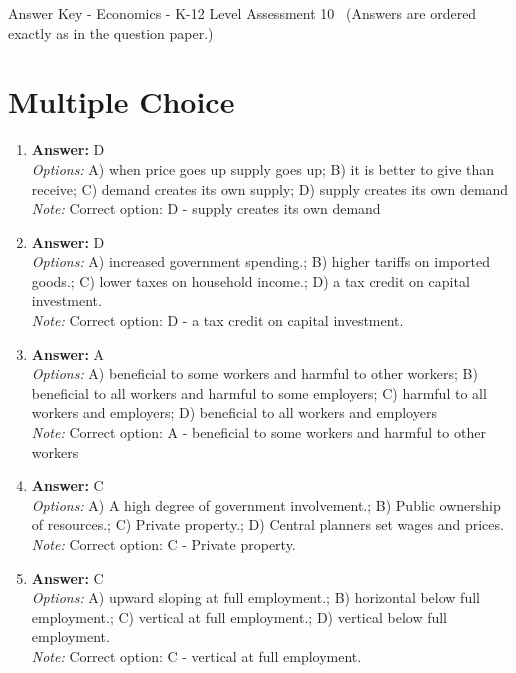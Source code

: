 \documentclass[12pt]{article}
\begin{document}
\begin{center}
Answer Key - Economics - K-12 Level Assessment 10 \
\small (Answers are ordered exactly as in the question paper.)
\end{center}

\section*{Multiple Choice}
\begin{enumerate}[label=\arabic*.]
\item \textbf{Answer:} D
\\ \textit{Options:} A) when price goes up supply goes up; B) it is better to give than receive; C) demand creates its own supply; D) supply creates its own demand
\\ \textit{Note:} Correct option: D - supply creates its own demand
\item \textbf{Answer:} D
\\ \textit{Options:} A) increased government spending.; B) higher tariffs on imported goods.; C) lower taxes on household income.; D) a tax credit on capital investment.
\\ \textit{Note:} Correct option: D - a tax credit on capital investment.
\item \textbf{Answer:} A
\\ \textit{Options:} A) beneficial to some workers and harmful to other workers; B) beneficial to all workers and harmful to some employers; C) harmful to all workers and employers; D) beneficial to all workers and employers
\\ \textit{Note:} Correct option: A - beneficial to some workers and harmful to other workers
\item \textbf{Answer:} C
\\ \textit{Options:} A) A high degree of government involvement.; B) Public ownership of resources.; C) Private property.; D) Central planners set wages and prices.
\\ \textit{Note:} Correct option: C - Private property.
\item \textbf{Answer:} C
\\ \textit{Options:} A) upward sloping at full employment.; B) horizontal below full employment.; C) vertical at full employment.; D) vertical below full employment.
\\ \textit{Note:} Correct option: C - vertical at full employment.
\end{enumerate}
\end{document}
